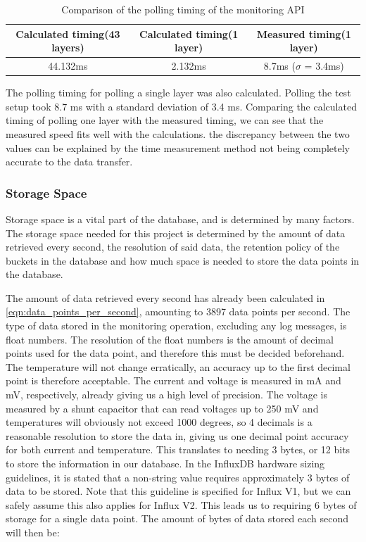 \documentclass[main.tex]{subfiles}
\begin{document}
\begin{table}[h]
\centering
\begin{tabular}{||c c c||} 
 \hline
  Calculated timing(43 layers) & Calculated timing(1 layer) & Measured timing(1 layer) \\ [0.5ex] 
 \hline\hline
    44.132ms & 2.132ms & 8.7ms ($\sigma$ = 3.4ms) \\  [1ex] 
 \hline
\end{tabular}
\caption{\label{tab:monitor_speed} Comparison of the polling timing of the monitoring API}
\end{table}
\FloatBarrier

The polling timing for polling a single layer was also calculated. Polling the test setup took 8.7 ms with a standard deviation of 3.4 ms. Comparing the calculated timing of polling one layer with the measured timing, we can see that the measured speed fits well with the calculations. the discrepancy between the two values can be explained by the time measurement method not being completely accurate to the data transfer. 

\subsubsection{Storage Space}
Storage space is a vital part of the database, and is determined by many factors. The storage space needed for this project is determined by the amount of data retrieved every second, the resolution of said data, the retention policy of the buckets in the database and how much space is needed to store the data points in the database.

The amount of data retrieved every second has already been calculated in \autoref{eqn:data_points_per_second}, amounting to 3897 data points per second. The type of data stored in the monitoring operation, excluding any log messages, is float numbers. The resolution of the float numbers is the amount of decimal points used for the data point, and therefore this must be decided beforehand. The temperature will not change erratically, an accuracy up to the first decimal point is therefore acceptable. The current and voltage is measured in mA and mV, respectively, already giving us a high level of precision. The voltage is measured by a shunt capacitor that can read voltages up to 250 mV and temperatures will obviously not exceed 1000 degrees, so 4 decimals is a reasonable resolution to store the data in, giving us one decimal point accuracy for both current and temperature. This translates to needing 3 bytes, or 12 bits to store the information in our database. In the InfluxDB hardware sizing guidelines, it is stated that a non-string value requires approximately 3 bytes of data to be stored. Note that this guideline is specified for Influx V1, but we can safely assume this also applies for Influx V2. This leads us to requiring 6 bytes of storage for a single data point. The amount of bytes of data stored each second will then be: 
\end{document}
